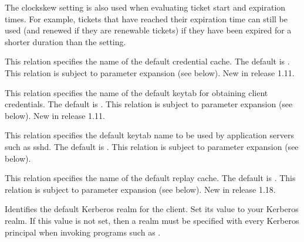 \documentclass[letterpaper,10pt,english]{sphinxmanual}
\begin{document}
\begin{description}
\sphinxAtStartPar
The clockskew setting is also used when evaluating ticket start
and expiration times.  For example, tickets that have reached
their expiration time can still be used (and renewed if they are
renewable tickets) if they have been expired for a shorter
duration than the  setting.

\sphinxAtStartPar
This relation specifies the name of the default credential cache.
The default is {\hyperref[\detokenize{mitK5defaults:paths}]{}}.  This relation is subject to parameter
expansion (see below).  New in release 1.11.

\sphinxAtStartPar
This relation specifies the name of the default keytab for
obtaining client credentials.  The default is {\hyperref[\detokenize{mitK5defaults:paths}]{}}.  This
relation is subject to parameter expansion (see below).
New in release 1.11.

\sphinxAtStartPar
This relation specifies the default keytab name to be used by
application servers such as sshd.  The default is {\hyperref[\detokenize{mitK5defaults:paths}]{}}.  This
relation is subject to parameter expansion (see below).

\sphinxAtStartPar
This relation specifies the name of the default replay cache.
The default is .  This relation is subject to parameter
expansion (see below).  New in release 1.18.

\sphinxAtStartPar
Identifies the default Kerberos realm for the client.  Set its
value to your Kerberos realm.  If this value is not set, then a
realm must be specified with every Kerberos principal when
invoking programs such as .


\end{description}
\end{document}
